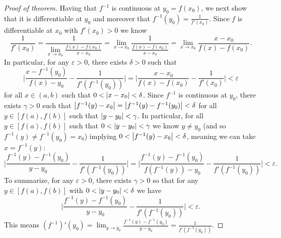 \documentclass[12 pt,letterpaper]{article}
\newcommand{\biggabs}[1]{\biggl|{#1}\biggr|}
\begin{document}
\begin{proof}[Proof of theorem]
\noindent
Having that $f^{-1}$ is continuous at $y_0=f(x_0)$,
we next show that it is differentiable at $y_0$ and moreover that $f^{-1}(y_0)=\frac1{f'(x_0)}$.
Since $f$ is differentiable at $x_0$ with $f'(x_0)>0$ we know
\begin{equation*}
\frac1{f'(x_0)}
=\frac1{\displaystyle\lim_{x\rightarrow x_0}\frac{f(x)-f(x_0)}{x-x_0}}
=\lim_{x\rightarrow x_0}\frac1{\displaystyle\frac{f(x)-f(x_0)}{x-x_0}}
=\lim_{x\rightarrow x_0}\frac{x-x_0}{f(x)-f(x_0)}.
\end{equation*}
In particular, for any $\varepsilon>0$, there exists $\delta>0$ such that
\begin{equation*}
\biggabs{\frac{x-f^{-1}(y_0)}{f(x)-y_0}-\frac1{f'(f^{-1}(y_0))}}
=\biggabs{\frac{x-x_0}{f(x)-f(x_0)}-\frac1{f'(x_0)}}
<\varepsilon
\end{equation*}
for all $x\in(a,b)$ such that $0<\abs{x-x_0}<\delta$.
Since $f^{-1}$ is continuous at $y_0$, there exists $\gamma>0$ such that $\abs{f^{-1}(y)-x_0}=\abs{f^{-1}(y)-f^{-1}(y_0)}<\delta$ for all $y\in[f(a),f(b)]$ such that $\abs{y-y_0}<\gamma$.
In particular, for all $y\in[f(a),f(b)]$ such that $0<\abs{y-y_0}<\gamma$ we know $y\neq y_0$ (and so $f^{-1}(y)\neq f^{-1}(y_0)=x_0$) implying $0<\abs{f^{-1}(y)-x_0}<\delta$, meaning we can take $x=f^{-1}(y)$:
\begin{equation*}
\biggabs{\frac{f^{-1}(y)-f^{-1}(y_0)}{y-y_0}-\frac1{f'(f^{-1}(y_0))}}
=\biggabs{\frac{f^{-1}(y)-f^{-1}(y_0)}{f(f^{-1}(y))-y_0}-\frac1{f'(f^{-1}(y_0))}}
<\varepsilon.
\end{equation*}
To summarize, for any $\varepsilon>0$, there exists $\gamma>0$ so that for any $y\in[f(a),f(b)]$ with $0<\abs{y-y_0}<\delta$ we have
\begin{equation*}
\biggabs{\frac{f^{-1}(y)-f^{-1}(y_0)}{y-y_0}-\frac1{f'(f^{-1}(y_0))}}
<\varepsilon.
\end{equation*}
This means $\displaystyle (f^{-1})'(y_0)=\lim_{y\rightarrow y_0}\frac{f^{-1}(y)-f^{-1}(y_0)}{y-y_0}=\frac1{f'(f^{-1}(y_0))}$.
\end{proof}

\clearpage

\section{}
\end{document}
